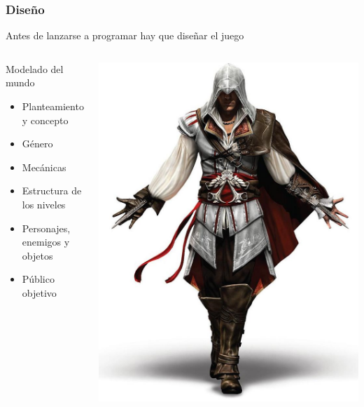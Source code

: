 \begin{frame}
	\frametitle{Diseño}
	
	\begin{center}
		Antes de lanzarse a programar hay que diseñar el juego
	\end{center}	
	
	\begin{columns}
	
	\column{175pt}
	\begin{block}{Modelado del mundo}
		\begin{itemize}
			\item Planteamiento y concepto
			\item Género
			\item Mecánicas
			\item Estructura de los niveles
			\item Personajes, enemigos y objetos
			\item Público objetivo
		\end{itemize}            
	\end{block}
	
	
	\column{125pt}
	\begin{center}
		\includegraphics[scale=0.2]{img/assassins.jpg}
	\end{center}	
	
	
	\end{columns}
\end{frame}


